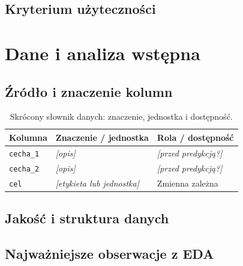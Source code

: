 \documentclass[10pt,twocolumn,a4paper]{article}
\newif\ifwskazowki
\newcommand{\wskazowka}[1]{\ifwskazowki
  \par\begingroup\small\color{black!72}\raggedright#1\par\endgroup\fi}
\newcommand{\pole}[1]{\textit{[#1]}}
\begin{document}
\subsection{Kryterium użyteczności}
\wskazowka{Wyjaśnij, co model ma wnieść ponad prosty punkt odniesienia.}

\section{Dane i analiza wstępna}
\subsection{Źródło i znaczenie kolumn}
\wskazowka{Podaj źródło, autora, odnośnik lub DOI, wersję/datę pobrania
i warunki wykorzystania danych. Opisz pozyskanie, populację,
liczbę rekordów i cech oraz ich znaczenie. Potwierdź zgodność
z wymaganiami zaakceptowanymi przez prowadzącego.}

\begin{table}[H]
\centering
\caption{Skrócony słownik danych: znaczenie, jednostka i dostępność.}
\label{tab:dane}
\footnotesize
\begin{tabularx}{\columnwidth}{@{}lYY@{}}
\toprule
Kolumna & Znaczenie / jednostka & Rola / dostępność\\
\midrule
\texttt{cecha\_1} & \pole{opis} & \pole{przed predykcją?}\\
\texttt{cecha\_2} & \pole{opis} & \pole{przed predykcją?}\\
\texttt{cel} & \pole{etykieta lub jednostka} & Zmienna zależna\\
\bottomrule
\end{tabularx}
\end{table}

\subsection{Jakość i struktura danych}
\wskazowka{Opisz braki, błędy, duplikaty, rzadkie kategorie, wartości
odstające i zależności wierszy. Oczywiście na bazie wykresów. Kazdy wykres musi mieć referencje w tekście oraz opis. Nie wrzucamy kodu do raportu. Klasyfikacja: liczebności i udziały klas.
Regresja: rozkład celu i jednostka.}

\wskazowka{Jeśli braki lub błędy dodano ręcznie, podaj mechanizm,
kolumny, nasilenie, ziarno i pule objęte zmianą. Zachowaj dane
oryginalne. }

\subsection{Najważniejsze obserwacje z EDA}
\wskazowka{Wybierz wykresy wspierające argumentację i zinterpretuj
je w tekście. Analizy służące wyborowi procedury wykonuj na train.
Nie analizuj końcowego testu w celu doboru metod.
Oddziel obserwację od hipotezy i zależność od przyczynowości.}
\end{document}
